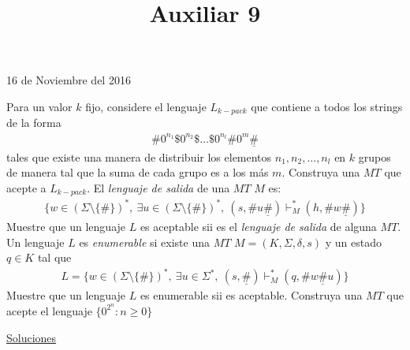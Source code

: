 \documentclass[dcc]{fcfmcourse}
\title{Auxiliar 9}
\begin{document}
\maketitle
\begin{center}
16 de Noviembre del 2016
\end{center}
\vspace{-1ex}
\begin{problems}
 \problem Para un valor $k$ fijo, considere el lenguaje $L_{k-pack}$ que contiene a todos los strings de la forma
\begin{align*}
    \#0^{n_{1}}\$0^{n_{2}}\$\ldots\$0^{n_{l}}\#0^{m}\underline{\#}
\end{align*}
tales que existe una manera de distribuir los elementos $n_{1},n_{2},\ldots,n_{l}$ en $k$ grupos de manera tal que la suma de cada grupo es a los más $m$. Construya una $MT$ que acepte a $L_{k-pack}$.
\problem El \textit{lenguaje de salida} de una $MT$ $M$ es:
\begin{align*}
   \{ w \in \left(\Sigma \setminus \{\#\}\right)^* ,\ \exists u \in \left(\Sigma \setminus \{\#\}\right)^*,\  \left(s,\# u\underline{\# }\right)\vdash_{M}^{*}\left(h,\# w\underline{\#}\right) \}
\end{align*}
Muestre que un lenguaje $L$ es aceptable sii es el \textit{lenguaje de salida} de alguna $MT$.
\problem Un lenguaje $L$ es \textit{enumerable} si existe una $MT$ $M=(K,\Sigma,\delta, s)$ y un estado $q \in K$ tal que
\begin{align*}
    L = \{ w\in \left(\Sigma \setminus \{\#\}\right)^*,\ \exists u \in \Sigma^*, \  \left(s,\underline{\# }\right)\vdash_{M}^{*}\left(q,\# w\underline{\#}u\right)\}
\end{align*}
Muestre que un lenguaje $L$ es enumerable sii es aceptable.
\problem Construya una $MT$ que acepte el lenguaje $\{0^{2^{n}}\colon n \ge 0\}$
\end{problems}
\newpage
\begin{center}
{\huge \underline{Soluciones}}
\end{center}
\end{document}
